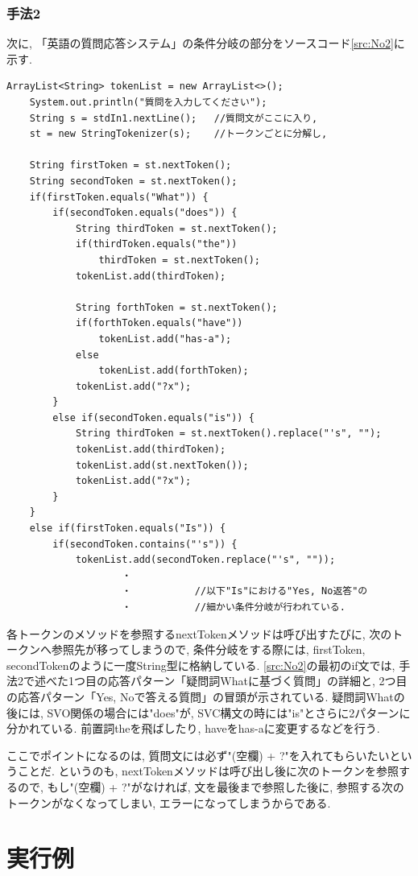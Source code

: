 ﻿\documentclass[uplatex,12pt]{jsarticle}
\begin{document}
\subsubsection{手法2}
次に, 「英語の質問応答システム」の条件分岐の部分をソースコード\ref{src:No2}に示す.
\begin{lstlisting}[caption=英語における質問応答, label=src:No2]
	ArrayList<String> tokenList = new ArrayList<>();
	System.out.println("質問を入力してください");
	String s = stdIn1.nextLine(); 	//質問文がここに入り,
	st = new StringTokenizer(s);	//トークンごとに分解し,

	String firstToken = st.nextToken();
	String secondToken = st.nextToken();
	if(firstToken.equals("What")) {
		if(secondToken.equals("does")) {
			String thirdToken = st.nextToken();
			if(thirdToken.equals("the")) 
				thirdToken = st.nextToken();
			tokenList.add(thirdToken);
	
			String forthToken = st.nextToken();
			if(forthToken.equals("have"))
				tokenList.add("has-a");
			else
				tokenList.add(forthToken);
			tokenList.add("?x");
		}
		else if(secondToken.equals("is")) {
			String thirdToken = st.nextToken().replace("'s", "");
			tokenList.add(thirdToken);
			tokenList.add(st.nextToken());
			tokenList.add("?x");
		}
	}
	else if(firstToken.equals("Is")) {
		if(secondToken.contains("'s")) {
			tokenList.add(secondToken.replace("'s", ""));
					・
					・	   		//以下"Is"における"Yes, No返答"の
					・			//細かい条件分岐が行われている.

\end{lstlisting}

各トークンのメソッドを参照するnextTokenメソッドは呼び出すたびに, 次のトークンへ参照先が移ってしまうので, 条件分岐をする際には, firstToken, secondTokenのように一度String型に格納している. \ref{src:No2}の最初のif文では, 手法2で述べた1つ目の応答パターン「疑問詞Whatに基づく質問」の詳細と, 2つ目の応答パターン「Yes, Noで答える質問」の冒頭が示されている. 疑問詞Whatの後には, SVO関係の場合には"does"が, SVC構文の時には"is"とさらに2パターンに分かれている. 前置詞theを飛ばしたり, haveをhas-aに変更するなどを行う. 

ここでポイントになるのは, 質問文には必ず"(空欄) + ?"を入れてもらいたいということだ. というのも, nextTokenメソッドは呼び出し後に次のトークンを参照するので, もし"(空欄) + ?"がなければ, 文を最後まで参照した後に, 参照する次のトークンがなくなってしまい, エラーになってしまうからである.

\section{実行例}
\end{document}
